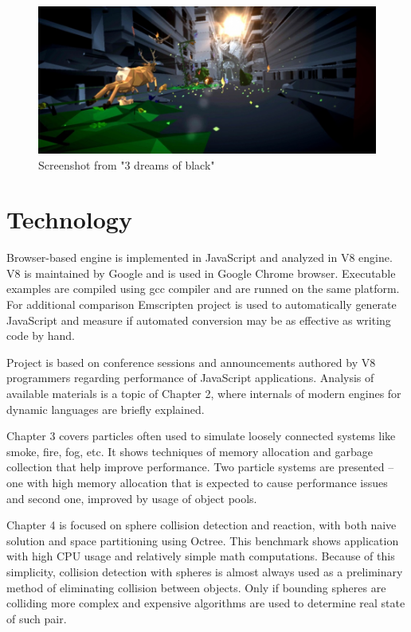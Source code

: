 \begin{figure}[h!]
  \caption{Screenshot from "3 dreams of black"}
  \label{img:rome}
  \centering
	\includegraphics[width=12cm]{summary/rome.jpg}
\end{figure}

\section{Technology}

Browser-based engine is implemented in JavaScript and analyzed in V8 engine. V8 is maintained by Google and is used in Google Chrome browser. Executable examples are compiled using gcc compiler and are runned on the same platform. For additional comparison Emscripten project is used to automatically generate JavaScript and measure if automated conversion may be as effective as writing code by hand.

Project is based on conference sessions and announcements authored by V8 programmers regarding performance of JavaScript applications. Analysis of available materials is a topic of Chapter 2, where internals of modern engines for dynamic languages are briefly explained.

Chapter 3 covers particles often used to simulate loosely connected systems like smoke, fire, fog, etc. It shows techniques of memory allocation and garbage collection that help improve performance. Two particle systems are presented -- one with high memory allocation that is expected to cause performance issues and second one, improved by usage of object pools.

Chapter 4 is focused on sphere collision detection and reaction, with both naive solution and space partitioning using Octree. This benchmark shows application with high CPU usage and relatively simple math computations. Because of this simplicity, collision detection with spheres is almost always used as a preliminary method of eliminating collision between objects. Only if bounding spheres are colliding more complex and expensive algorithms are used to determine real state of such pair.


